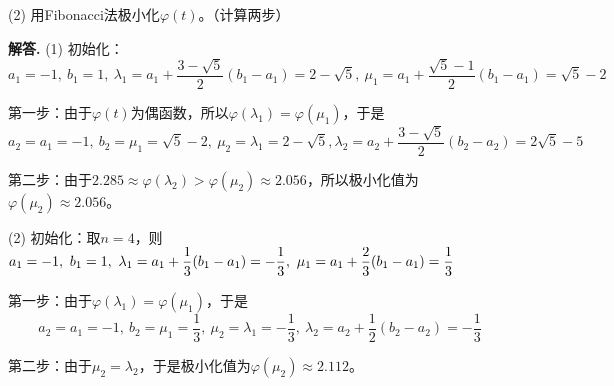 \documentclass[12pt, a4paper, oneside]{ctexart}
\newenvironment{solution}{\par\noindent\textbf{解答. }}{\bigskip\par}
\begin{document}
(2) 用Fibonacci法极小化$\varphi(t)$。（计算两步）
\begin{solution}
    (1) 初始化：
    \begin{equation*}
        a_1 = -1,\ b_1 = 1,\ \lambda_1 = a_1+\frac{3-\sqrt{5}}{2}(b_1-a_1) = 2-\sqrt{5},\ \mu_1 = a_1+\frac{\sqrt{5}-1}{2}(b_1-a_1) = \sqrt{5} - 2
    \end{equation*}

    第一步：由于$\varphi(t)$为偶函数，所以$\varphi(\lambda_1) = \varphi(\mu_1)$，于是
    \begin{equation*}
        a_2=a_1=-1,\ b_2=\mu_1=\sqrt{5}-2,\ \mu_2=\lambda_1 = 2-\sqrt{5}, \lambda_2 = a_2+\frac{3-\sqrt{5}}{2}(b_2-a_2) = 2\sqrt{5}-5
    \end{equation*}

    第二步：由于$2.285\approx\varphi(\lambda_2) > \varphi(\mu_2)\approx 2.056$，所以极小化值为$\varphi(\mu_2)\approx 2.056$。

    (2) 初始化：取$n = 4$，则$\displaystyle a_1 = -1,\ b_1 = 1,\ \lambda_1 = a_1 + \frac{1}{3}(b_1-a_1) = -\frac{1}{3},\ \mu_1 = a_1+\frac{2}{3}(b_1-a_1) = \frac{1}{3}$

    第一步：由于$\varphi(\lambda_1) = \varphi(\mu_1)$，于是
    \begin{equation*}
        a_2 = a_1 = -1,\ b_2=\mu_1=\frac{1}{3},\ \mu_2 = \lambda_1 = -\frac{1}{3},\ \lambda_2 = a_2+\frac{1}{2}(b_2-a_2) = -\frac{1}{3}
    \end{equation*}

    第二步：由于$\mu_2 = \lambda_2$，于是极小化值为$\varphi(\mu_2) \approx 2.112$。
\end{solution}
\end{document}
